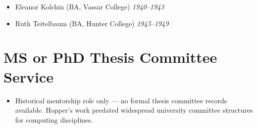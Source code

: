 \documentclass[11pt]{report}
\newcommand{\dates}[1]{\hfill \textit{#1}}
\begin{document}
\begin{internalonly}
\begin{itemize}

\item Eleanor Kolchin (BA, Vassar College)
  \dates{1940--1943}

\item Ruth Teitelbaum (BA, Hunter College)
  \dates{1945--1949}

\end{itemize}

\section{MS or PhD Thesis Committee Service}

\begin{itemize}
\item Historical mentorship role only — no formal thesis committee records available. Hopper's work predated widespread university committee structures for computing disciplines.
\end{itemize}

\end{internalonly}
\end{document}
